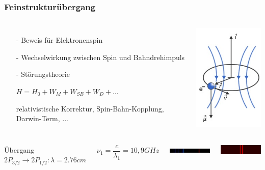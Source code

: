 \begin{frame}
  \frametitle{Feinstrukturübergang}
	\begin{columns}
		\begin{itemize}
		\item[-] Beweis für Elektronenspin
		\item[-] Wechselwirkung zwischen Spin und Bahndrehimpuls
		\item[-] Störungstheorie
		\item[]  $H = H_0+W_M + W_{SB} +W_D+ \dots$
		\item[]  relativistische Korrektur, Spin-Bahn-Kopplung, Darwin-Term, ...
		\end{itemize}
		
		
		\includegraphics[width = 4cm]{./pictures/feinstrukturelektron}
			
	\end{columns}
	
	
	
\end{frame}

\begin{frame}
	\begin{columns}
		\column{.6\textwidth}
		Übergang $2P_{3/2} \rightarrow 2P_{1/2}: \lambda = 2.76cm$
				
		$\nu_1 = \dfrac{c}{\lambda_1} = 10,9 GHz $
		\vspace{.5cm}
				
		\column{.4\textwidth}
		\includegraphics[width = 4cm]{./pictures/wasserstoffSpektrum}
			
		\includegraphics[width = 4cm]{./pictures/fine_structure_hydrogen}
	\end{columns}
\end{frame}

